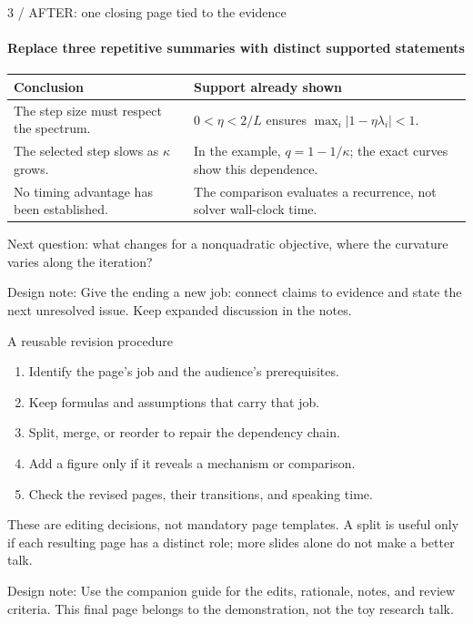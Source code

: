 \documentclass[aspectratio=169,11pt]{beamer}
\newcommand{\editnote}[1]{\par\vfill{\scriptsize\color{talkorange}Design note: #1}}
\begin{document}
\begin{frame}[label=ending-after]{3 / AFTER: one closing page tied to the evidence}
\framesubtitle{Replace three repetitive summaries with distinct supported statements}
\small
\begin{tabular}{@{}p{}p{}@{}}
\toprule
Conclusion & Support already shown \\
\midrule
The step size must respect the spectrum. & $0<\eta<2/L$ ensures $\max_i|1-\eta\lambda_i|<1$. \\[2mm]
The selected step slows as $\kappa$ grows. & In the example, $q=1-1/\kappa$; the exact curves show this dependence. \\[2mm]
No timing advantage has been established. & The comparison evaluates a recurrence, not solver wall-clock time. \\
\bottomrule
\end{tabular}\par
\vspace{4mm}
\normalsize\raggedright Next question: what changes for a nonquadratic objective, where the curvature varies along the iteration?\par
\editnote{Give the ending a new job: connect claims to evidence and state the next unresolved issue. Keep expanded discussion in the notes.}
\end{frame}

\begin{frame}{A reusable revision procedure}
\begin{enumerate}
\item Identify the page's job and the audience's prerequisites.
\item Keep formulas and assumptions that carry that job.
\item Split, merge, or reorder to repair the dependency chain.
\item Add a figure only if it reveals a mechanism or comparison.
\item Check the revised pages, their transitions, and speaking time.
\end{enumerate}
\vspace{3mm}
\small These are editing decisions, not mandatory page templates. A split is useful only if each resulting page has a distinct role; more slides alone do not make a better talk.
\editnote{Use the companion guide for the edits, rationale, notes, and review criteria. This final page belongs to the demonstration, not the toy research talk.}
\end{frame}
\end{document}

